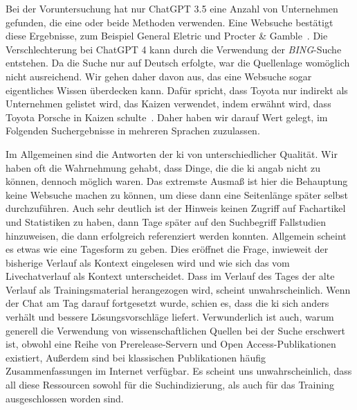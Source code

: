 
Bei der Voruntersuchung hat nur ChatGPT 3.5 eine Anzahl von Unternehmen gefunden, die eine oder beide Methoden verwenden. Eine Websuche bestätigt diese Ergebnisse, zum Beispiel General Eletric und Procter \& Gamble~\cite{noauthor_heat_nodate,noauthor_what_nodate}. Die Verschlechterung bei ChatGPT 4 kann durch die Verwendung der \textit{BING}-Suche entstehen. Da die Suche nur auf Deutsch erfolgte, war die Quellenlage womöglich nicht ausreichend. Wir gehen daher davon aus, das eine Websuche sogar eigentliches Wissen überdecken kann.
Dafür spricht, dass Toyota nur indirekt als Unternehmen gelistet wird, das Kaizen verwendet, indem erwähnt wird, dass Toyota Porsche in Kaizen schulte~\cite{noauthor_kaizen_nodate}. Daher haben wir darauf Wert gelegt, im Folgenden Suchergebnisse in mehreren Sprachen zuzulassen.

Im Allgemeinen sind die Antworten der \gls{ki} von unterschiedlicher Qualität. Wir haben oft die Wahrnehmung gehabt, dass Dinge, die die \gls{ki} angab nicht zu können, dennoch möglich waren. Das extremste Ausmaß ist hier die Behauptung keine Websuche machen zu können, um diese dann eine Seitenlänge später selbst durchzuführen. Auch sehr deutlich ist der Hinweis keinen Zugriff auf Fachartikel und Statistiken zu haben, dann Tage später auf den Suchbegriff Fallstudien hinzuweisen, die dann erfolgreich referenziert werden konnten.
Allgemein scheint es etwas wie eine Tagesform zu geben. Dies eröffnet die Frage, inwieweit der bisherige Verlauf als Kontext eingelesen wird und wie sich das vom Livechatverlauf als Kontext unterscheidet. Dass im Verlauf des Tages der alte Verlauf als Trainingsmaterial herangezogen wird, scheint unwahrscheinlich. Wenn der Chat am Tag darauf fortgesetzt wurde, schien es, dass die \gls{ki} sich anders verhält und bessere Lösungsvorschläge liefert.
Verwunderlich ist auch, warum generell die Verwendung von wissenschaftlichen Quellen bei der Suche erschwert ist, obwohl eine Reihe von Prerelease-Servern und Open Access-Publikationen existiert, Außerdem sind bei klassischen Publikationen häufig Zusammenfassungen im Internet verfügbar. Es scheint uns unwahrscheinlich, dass all diese Ressourcen sowohl für die Suchindizierung, als auch für das Training ausgeschlossen worden sind.

